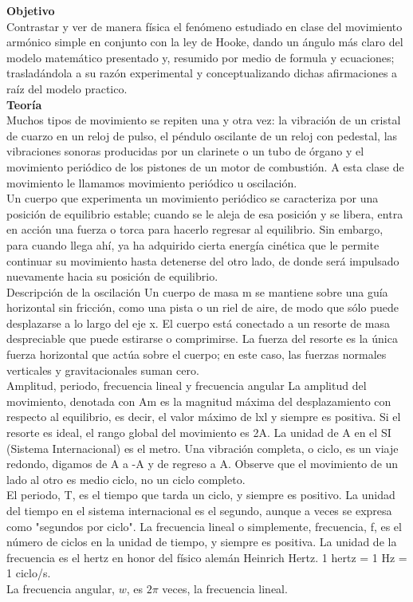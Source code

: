 \documentclass[11pt,a4paper]{article}
\begin{document}
\begin{multicols}{2} 
\textbf{Objetivo}  \\
Contrastar y ver de manera física el fenómeno estudiado en clase del movimiento armónico simple en conjunto con la ley de Hooke, dando un ángulo más claro del modelo matemático presentado y, resumido por medio de formula y ecuaciones; trasladándola a su razón experimental y conceptualizando dichas afirmaciones a raíz del modelo practico.\\
\textbf{Teoría}\\
 Muchos tipos de movimiento se repiten una y otra vez: la vibración de un cristal de cuarzo en un reloj de pulso, el péndulo oscilante de un reloj con pedestal, las vibraciones sonoras producidas por un clarinete o un tubo de órgano y el movimiento periódico de los pistones de un motor de combustión. A esta clase de movimiento le llamamos movimiento periódico u oscilación.\\
Un cuerpo que experimenta un movimiento periódico se caracteriza por una posición de equilibrio estable; cuando se le aleja de esa posición y se libera, entra en acción una fuerza o torca para hacerlo regresar al equilibrio. Sin embargo, para cuando llega ahí, ya ha adquirido cierta energía cinética que le permite continuar su movimiento hasta detenerse del otro lado, de donde será impulsado nuevamente hacia su posición de equilibrio.\\
Descripción de la oscilación
Un cuerpo de masa m se mantiene sobre una guía horizontal sin fricción, como una pista o un riel de aire, de modo que sólo puede desplazarse a lo largo del eje x. El cuerpo está conectado a un resorte de masa despreciable que puede estirarse o comprimirse. La fuerza del resorte es la única fuerza horizontal que actúa sobre el cuerpo; en este caso, las fuerzas normales verticales y gravitacionales suman cero.\\
Amplitud, periodo, frecuencia lineal y frecuencia angular
La amplitud del movimiento, denotada con Am es la magnitud máxima del desplazamiento con respecto al equilibrio, es decir, el valor máximo de lxl y siempre es positiva. Si el resorte es ideal, el rango global del movimiento es 2A. La unidad de A en el SI (Sistema Internacional) es el metro. Una vibración completa, o ciclo, es un viaje redondo, digamos de A a -A y de regreso a A. Observe que el movimiento de un lado al otro es medio ciclo, no un ciclo completo.\\
El periodo, T, es el tiempo que tarda un ciclo, y siempre es positivo. La unidad del tiempo en el sistema internacional es el segundo, aunque a veces se expresa como "segundos por ciclo".
La frecuencia lineal o simplemente, frecuencia, f, es el número de ciclos en la unidad de tiempo, y siempre es positiva. La unidad de la frecuencia es el hertz en honor del físico alemán Heinrich Hertz.
1 hertz = 1 Hz = 1 ciclo/s. \\
La frecuencia angular, $w$, es $2 \pi$  veces, la frecuencia lineal.\\


\end{multicols}
\end{document}
